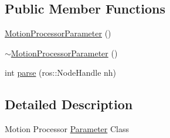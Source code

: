 \subsection*{\-Public \-Member \-Functions}
\begin{DoxyCompactItemize}
\item 
\hyperlink{classLRM_1_1MotionProcessorParameter_a755180a791ef857695b4484b1e887cfe}{\-Motion\-Processor\-Parameter} ()
\item 
\hyperlink{classLRM_1_1MotionProcessorParameter_a15e756001bbb997a2a7cda443cbcd4bf}{$\sim$\-Motion\-Processor\-Parameter} ()
\item 
int \hyperlink{classLRM_1_1MotionProcessorParameter_a773949b98bb0c02dd8c03f9c74af0481}{parse} (ros\-::\-Node\-Handle nh)
\end{DoxyCompactItemize}


\subsection{\-Detailed \-Description}
\-Motion \-Processor \hyperlink{classLRM_1_1Parameter}{\-Parameter} \-Class 

